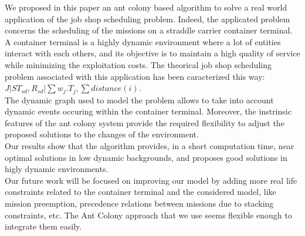 \documentclass[a4paper,10pt]{article}
\begin{document}
We proposed in this paper an ant colony based algorithm to solve a real world application of the job shop scheduling problem. Indeed, the applicated problem concerns the scheduling of the missions on a straddle carrier container terminal. A container terminal is a highly dynamic environment where a lot of entities interact with each others, and its objective is to maintain a high quality of service while minimizing the exploitation costs. The theorical job shop scheduling problem associated with this application has been caracterized this way: ${ J|ST_{sd}, R_{sd}|\sum w_j.T_{j} , \sum distance(i)}$.\\

The dynamic graph used to model the problem allows to take into account dynamic events occuring within the container terminal. Moreover, the instrinsic features of the ant colony system provide the required flexibility to adjust the proposed solutions to the changes of the environment.\\

Our results show that the algorithm provides, in a short computation time, near optimal solutions in low dynamic backgrounds, and proposes good solutions in higly dynamic environments.\\

Our future work will be focused on improving our model by adding more real life constraints related to the container terminal and the considered model, like mission preemption, precedence relations between missions due to stacking constraints, etc. The Ant Colony approach that we use seems flexible enough to integrate them easily.



\end{document}
